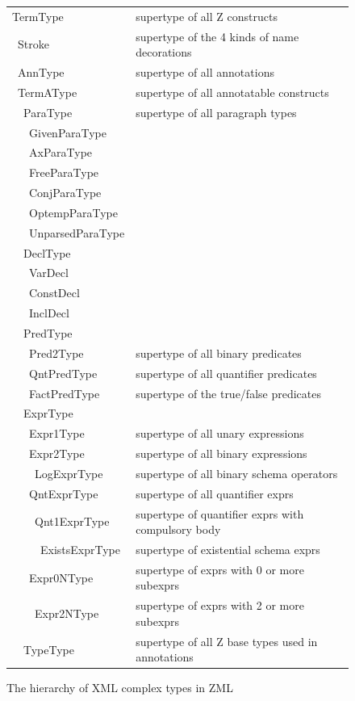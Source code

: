\documentclass{llncs}  %
\begin{document}
\newcommand{\I}{\hbox{\ \quad}}
\begin{figure}[htbp]
\begin{scriptsize}
\begin{tabular}{ll}
TermType                  &supertype of all Z constructs \\
\I Stroke                 &supertype of the 4 kinds of name decorations\\
\I AnnType                &supertype of all annotations\\
\I TermAType              &supertype of all annotatable constructs\\
\I\I  ParaType            &supertype of all paragraph types\\
\I\I\I  GivenParaType\\
\I\I\I  AxParaType\\
\I\I\I  FreeParaType\\
\I\I\I  ConjParaType\\
\I\I\I  OptempParaType\\
\I\I\I  UnparsedParaType\\
\I\I  DeclType\\
\I\I\I  VarDecl\\
\I\I\I  ConstDecl\\
\I\I\I  InclDecl\\
\I\I  PredType\\
\I\I\I  Pred2Type         &supertype of all binary predicates\\
\I\I\I  QntPredType       &supertype of all quantifier predicates\\
\I\I\I  FactPredType      &supertype of the true/false predicates\\
\I\I  ExprType\\
\I\I\I  Expr1Type         &supertype of all unary expressions\\
\I\I\I  Expr2Type         &supertype of all binary expressions\\
\I\I\I\I  LogExprType     &supertype of all binary schema operators\\
\I\I\I  QntExprType       &supertype of all quantifier exprs\\
\I\I\I\I  Qnt1ExprType    &supertype of quantifier exprs with compulsory body\\
\I\I\I\I\I  ExistsExprType &supertype of existential schema exprs\\
\I\I\I  Expr0NType        &supertype of exprs with 0 or more subexprs\\
\I\I\I\I  Expr2NType      &supertype of exprs with 2 or more subexprs\\
\I\I  TypeType            &supertype of all Z base types used in annotations\\
\end{tabular}
\end{scriptsize}
\caption{The hierarchy of XML complex types in ZML}
\label{fig:hier}
\end{figure}
\end{document}
